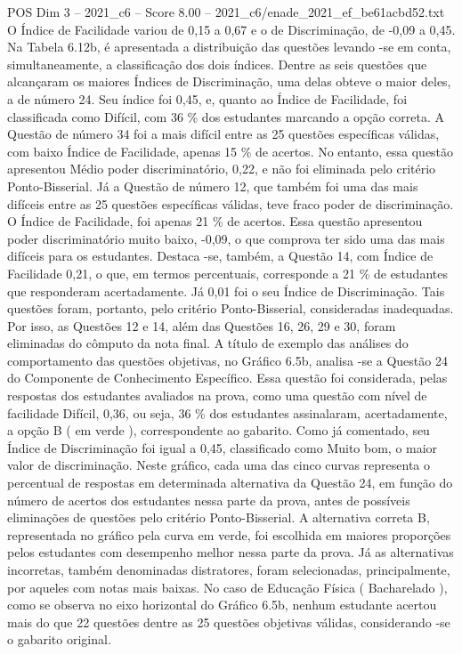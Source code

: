 \begin{textsample}{POS Dim 3 – 2021\_c6 – Score 8.00 – 2021\_c6/enade\_2021\_ef\_be61acbd52.txt}
O Índice de Facilidade variou de 0,15 a 0,67 e o de Discriminação, de -0,09 a 0,45.
Na Tabela 6.12b, é apresentada a distribuição das questões levando -se em conta, simultaneamente, a classificação dos dois índices.
Dentre as seis questões que alcançaram os maiores Índices de Discriminação, uma delas obteve o maior deles, a de número 24.
Seu índice foi 0,45, e, quanto ao Índice de Facilidade, foi classificada como Difícil, com 36 \% dos estudantes marcando a opção correta.
A Questão de número 34 foi a mais difícil entre as 25 questões específicas válidas, com baixo Índice de Facilidade, apenas 15 \% de acertos.
No entanto, essa questão apresentou Médio poder discriminatório, 0,22, e não foi eliminada pelo critério Ponto-Bisserial.
Já a Questão de número 12, que também foi uma das mais difíceis entre as 25 questões específicas válidas, teve fraco poder de discriminação.
O Índice de Facilidade, foi apenas 21 \% de acertos.
Essa questão apresentou poder discriminatório muito baixo, -0,09, o que comprova ter sido uma das mais difíceis para os estudantes.
Destaca -se, também, a Questão 14, com Índice de Facilidade 0,21, o que, em termos percentuais, corresponde a 21 \% de estudantes que responderam acertadamente.
Já 0,01 foi o seu Índice de Discriminação.
Tais questões foram, portanto, pelo critério Ponto-Bisserial, consideradas inadequadas.
Por isso, as Questões 12 e 14, além das Questões 16, 26, 29 e 30, foram eliminadas do cômputo da nota final.
A título de exemplo das análises do comportamento das questões objetivas, no Gráfico 6.5b, analisa -se a Questão 24 do Componente de Conhecimento Específico.
Essa questão foi considerada, pelas respostas dos estudantes avaliados na prova, como uma questão com nível de facilidade Difícil, 0,36, ou seja, 36 \% dos estudantes assinalaram, acertadamente, a opção B ( em verde ), correspondente ao gabarito.
Como já comentado, seu Índice de Discriminação foi igual a 0,45, classificado como Muito bom, o maior valor de discriminação.
Neste gráfico, cada uma das cinco curvas representa o percentual de respostas em determinada alternativa da Questão 24, em função do número de acertos dos estudantes nessa parte da prova, antes de possíveis eliminações de questões pelo critério Ponto-Bisserial.
A alternativa correta B, representada no gráfico pela curva em verde, foi escolhida em maiores proporções pelos estudantes com desempenho melhor nessa parte da prova.
Já as alternativas incorretas, também denominadas distratores, foram selecionadas, principalmente, por aqueles com notas mais baixas.
No caso de Educação Física ( Bacharelado ), como se observa no eixo horizontal do Gráfico 6.5b, nenhum estudante acertou mais do que 22 questões dentre as 25 questões objetivas válidas, considerando -se o gabarito original.

\end{textsample}
